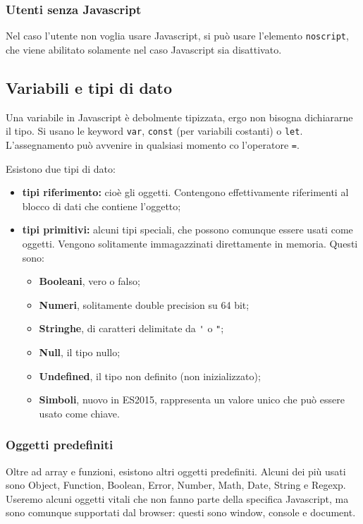 \documentclass[a4paper,11pt]{article}
\begin{document}
\subsubsection{Utenti senza Javascript}
Nel caso l'utente non voglia usare Javascript, si può usare l'elemento \lstinline|noscript|, che viene abilitato solamente nel caso Javascript sia disattivato.

\subsection{Variabili e tipi di dato}
Una variabile in Javascript è debolmente tipizzata, ergo non bisogna dichiararne il tipo.
Si usano le keyword \lstinline|var|, \lstinline|const| (per variabili costanti) o \lstinline|let|.
L'assegnamento può avvenire in qualsiasi momento co l'operatore \lstinline|=|.

Esistono due tipi di dato:
\begin{itemize}
	\item \textbf{tipi riferimento:} cioè gli oggetti. Contengono effettivamente riferimenti al blocco di dati che contiene l'oggetto;
	\item \textbf{tipi primitivi:} alcuni tipi speciali, che possono comunque essere usati come oggetti. Vengono solitamente immagazzinati direttamente in memoria.
		Questi sono:
		\begin{itemize}
			\item \textbf{Booleani}, vero o falso;
			\item \textbf{Numeri}, solitamente double precision su 64 bit;
			\item \textbf{Stringhe}, di caratteri delimitate da \lstinline|'| o \lstinline|"|;
			\item \textbf{Null}, il tipo nullo;
			\item \textbf{Undefined}, il tipo non definito (non inizializzato);
			\item \textbf{Simboli}, nuovo in ES2015, rappresenta un valore unico che può essere usato come chiave.
		\end{itemize}
\end{itemize}

\subsubsection{Oggetti predefiniti}
Oltre ad array e funzioni, esistono altri oggetti predefiniti.
Alcuni dei più usati sono Object, Function, Boolean, Error, Number, Math, Date, String e Regexp.
Useremo alcuni oggetti vitali che non fanno parte della specifica Javascript, ma sono comunque supportati dal browser: questi sono window, console e document.
\end{document}

